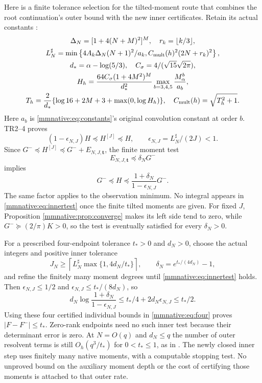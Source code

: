 \documentclass[11pt]{article}
\begin{document}
Here is a finite tolerance selection for the tilted-moment route that
combines the root continuation's outer bound with the new inner
certificates.  Retain its actual constants \cite{mmnative:TR}:
\begin{equation}\label{mmnative:eq:Lsharp}
 \begin{gathered}
 \Delta_N=[1+4(N+M)^2]^M,\quad r_k=\lfloor k/3\rfloor,\\
 L_N^\sharp=\min\left\{4A_k\Delta_N(N+1)^2/a_k,
                  C_{\rm mult}(h)^2(2N+r_k)^2\right\},\\
 d_*=\alpha-\log(5/3),\quad C_\sigma=4/(\sqrt{15}\sqrt{2\pi}),\\
 H_h=\frac{64C_\sigma(1+4M^2)^M}{d_*^2}
                   \max_{b=3,4,5}\frac{M_\alpha^b}{a_b},\\
 T_h=\frac2{d_*}\{\log16+2M+3+\max(0,\log H_h)\},
 \quad C_{\rm mult}(h)=\sqrt{T_h^2+1}.
 \end{gathered}
\end{equation}
Here $a_b$ is \eqref{mmnative:eq:constants}'s original convolution constant
at order $b$.  TR2--4 proves
\begin{equation}\label{mmnative:eq:outerrelative}
 (1-\epsilon_{N,J})H\preceq H^{[J]}\preceq H,
 \qquad\epsilon_{N,J}=L_N^\sharp/(2J)<1.
\end{equation}
Since $G^-\preceq H^{[J]}\preceq G^-+E_{N,J,\mathbf t}$,
the finite moment test
\begin{equation}\label{mmnative:eq:innertest}
 E_{N,J,\mathbf t}\preceq\delta_NG^-
\end{equation}
implies
\begin{equation}\label{mmnative:eq:jointrelative}
 G^-\preceq H\preceq
 \frac{1+\delta_N}{1-\epsilon_{N,J}}G^-.
\end{equation}
The same factor applies to the observation minimum.  No integral
appears in \eqref{mmnative:eq:innertest} once the finite tilted moments are
given.  For fixed $J$, Proposition \ref{mmnative:prop:converge} makes its left
side tend to zero, while $G^-\succeq(2/\pi)K>0$, so the test is
eventually satisfied for every $\delta_N>0$.

For a prescribed four-endpoint tolerance $t_*>0$ and $d_N>0$, choose
the actual integers and positive inner tolerance
\begin{equation}\label{mmnative:eq:tolerance}
 J_N\ge\left\lceil L_N^\sharp\max\{1,4d_N/t_*\}\right\rceil,
 \qquad\delta_N=e^{t_*/(4d_N)}-1,
\end{equation}
and refine the finitely many moment degrees until \eqref{mmnative:eq:innertest}
holds.  Then $\epsilon_{N,J}\le1/2$ and
$\epsilon_{N,J}\le t_*/(8d_N)$, so
\[
 d_N\log\frac{1+\delta_N}{1-\epsilon_{N,J}}
 \le t_*/4+2d_N\epsilon_{N,J}\le t_*/2.
\]
Using these four certified individual bounds in \eqref{mmnative:eq:four}
proves $|F-F^-|\le t_*$.  Zero-rank endpoints need no such inner
test because their determinant error is zero.  At $N=O(q)$ and
$d_N\le q$ the number of outer resolvent terms is still
$O_h(q^3/t_*)$ for $0<t_*\le1$, as in \cite{mmnative:TR}.  The newly closed
inner step uses finitely many native moments, with a computable
stopping test.  No unproved bound on the auxiliary moment depth or
the cost of certifying those moments is attached to that outer rate.
\end{document}
